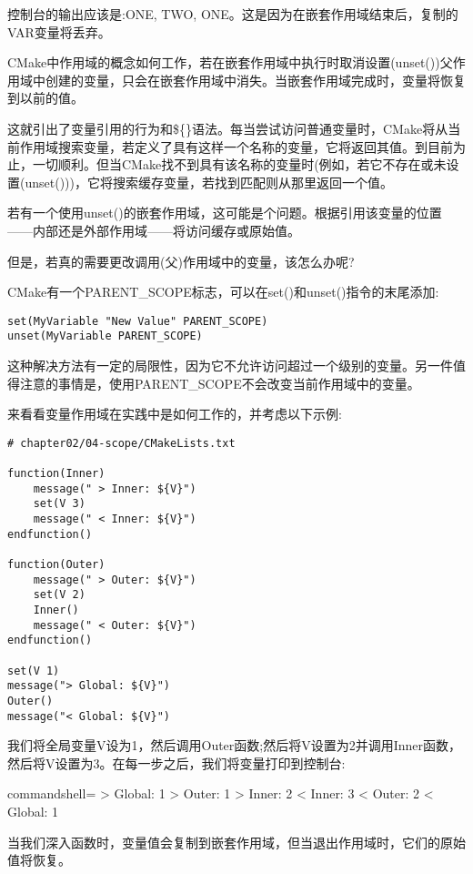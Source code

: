 控制台的输出应该是:ONE, TWO, ONE。这是因为在嵌套作用域结束后，复制的VAR变量将丢弃。

CMake中作用域的概念如何工作，若在嵌套作用域中执行时取消设置(unset())父作用域中创建的变量，只会在嵌套作用域中消失。当嵌套作用域完成时，变量将恢复到以前的值。

这就引出了变量引用的行为和\$\{\}语法。每当尝试访问普通变量时，CMake将从当前作用域搜索变量，若定义了具有这样一个名称的变量，它将返回其值。到目前为止，一切顺利。但当CMake找不到具有该名称的变量时(例如，若它不存在或未设置(unset()))，它将搜索缓存变量，若找到匹配则从那里返回一个值。

若有一个使用unset()的嵌套作用域，这可能是个问题。根据引用该变量的位置——内部还是外部作用域——将访问缓存或原始值。

但是，若真的需要更改调用(父)作用域中的变量，该怎么办呢?

CMake有一个PARENT\_SCOPE标志，可以在set()和unset()指令的末尾添加:

\begin{lstlisting}[style=styleCMake]
set(MyVariable "New Value" PARENT_SCOPE)
unset(MyVariable PARENT_SCOPE)
\end{lstlisting}

这种解决方法有一定的局限性，因为它不允许访问超过一个级别的变量。另一件值得注意的事情是，使用PARENT\_SCOPE不会改变当前作用域中的变量。

来看看变量作用域在实践中是如何工作的，并考虑以下示例:

\begin{lstlisting}[style=styleCMake]
# chapter02/04-scope/CMakeLists.txt

function(Inner)
	message(" > Inner: ${V}")
	set(V 3)
	message(" < Inner: ${V}")
endfunction()

function(Outer)
	message(" > Outer: ${V}")
	set(V 2)
	Inner()
	message(" < Outer: ${V}")
endfunction()

set(V 1)
message("> Global: ${V}")
Outer()
message("< Global: ${V}")
\end{lstlisting}

我们将全局变量V设为1，然后调用Outer函数;然后将V设置为2并调用Inner函数，然后将V设置为3。在每一步之后，我们将变量打印到控制台:

\begin{tcblisting}{commandshell={}}
> Global: 1
  > Outer: 1
    > Inner: 2
    < Inner: 3
  < Outer: 2
< Global: 1
\end{tcblisting}

当我们深入函数时，变量值会复制到嵌套作用域，但当退出作用域时，它们的原始值将恢复。

